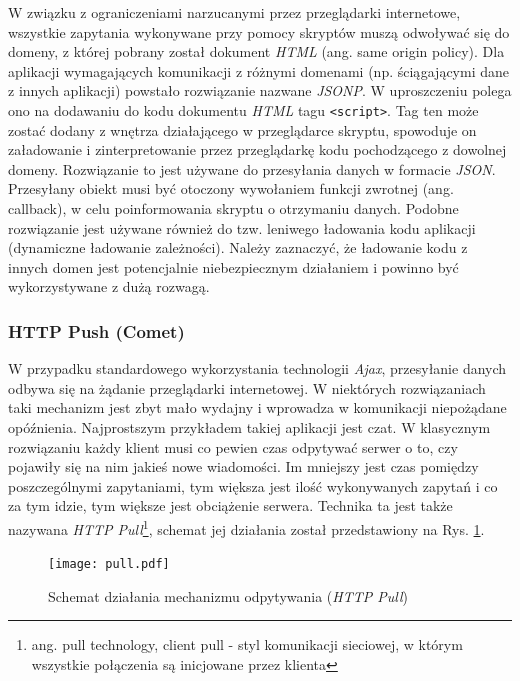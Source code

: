 \documentclass[a4paper,12pt]{article}
\providecommand{\imref}[1]{Rys. \ref{#1}} %
\begin{document}
W związku z ograniczeniami narzucanymi przez przeglądarki internetowe,
wszystkie zapytania wykonywane przy pomocy skryptów muszą odwoływać
się do domeny, z której pobrany został dokument \emph{HTML} (ang. same
origin policy\cite{origin}). Dla aplikacji wymagających komunikacji z
różnymi domenami (np. ściągającymi dane z innych aplikacji) powstało
rozwiązanie nazwane \emph{JSONP}. W uproszczeniu polega ono na
dodawaniu do kodu dokumentu \emph{HTML} tagu \texttt{<script>}. Tag
ten może zostać dodany z wnętrza działającego w przeglądarce skryptu,
spowoduje on załadowanie i zinterpretowanie przez przeglądarkę kodu
pochodzącego z dowolnej domeny\cite{json}. Rozwiązanie to jest używane
do przesyłania danych w formacie \emph{JSON}. Przesyłany obiekt musi
być otoczony wywołaniem funkcji zwrotnej (ang. callback), w celu
poinformowania skryptu o otrzymaniu danych. Podobne rozwiązanie jest
używane również do tzw. leniwego ładowania kodu aplikacji (dynamiczne
ładowanie zależności). Należy zaznaczyć, że ładowanie kodu z innych
domen jest potencjalnie niebezpiecznym działaniem i powinno być
wykorzystywane z dużą rozwagą.

\subsubsection{HTTP Push (Comet)}
W przypadku standardowego wykorzystania technologii \emph{Ajax},
przesyłanie danych odbywa się na żądanie przeglądarki internetowej. W
niektórych rozwiązaniach taki mechanizm jest zbyt mało wydajny i
wprowadza w komunikacji niepożądane opóźnienia. Najprostszym
przykładem takiej aplikacji jest czat. W klasycznym rozwiązaniu każdy
klient musi co pewien czas odpytywać serwer o to, czy pojawiły się na
nim jakieś nowe wiadomości. Im mniejszy jest czas pomiędzy
poszczególnymi zapytaniami, tym większa jest ilość wykonywanych
zapytań i co za tym idzie, tym większe jest obciążenie
serwera. Technika ta jest także nazywana \emph{HTTP
  Pull}\footnote{ang. pull technology, client pull - styl komunikacji
  sieciowej, w którym wszystkie połączenia są inicjowane przez
  klienta\cite{pull}}, schemat jej działania został przedstawiony na
\imref{pull}.

\begin{figure}[ht]
  \begin{center}
    \texttt{[image: pull.pdf]}
  \end{center}
  \caption{Schemat działania mechanizmu odpytywania (\emph{HTTP
      Pull})}
  \label{pull}
\end{figure}
\end{document}
